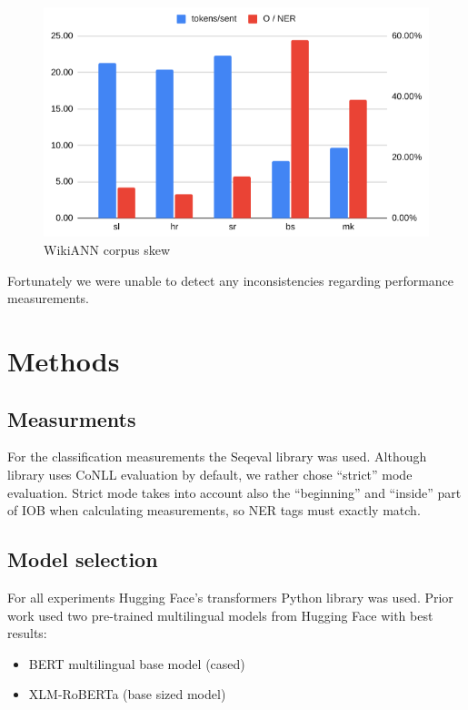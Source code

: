 \documentclass[sigconf]{acmart}
\begin{document}
\begin{figure}[h]
  \label{fig:corpora_analysis1}
  \centering
  \includegraphics[width=\linewidth]{wikiann-skew}
  \caption{WikiANN corpus skew}
\end{figure}

Fortunately we were unable to detect any inconsistencies regarding performance measurements.

\section{Methods}
\subsection{Measurments}
For the classification measurements the Seqeval library\cite{seqeval} was used.
Although library uses CoNLL evaluation by default, we rather chose ``strict'' mode evaluation.
Strict mode takes into account also the ``beginning'' and ``inside'' part of IOB when calculating measurements,
so NER tags must exactly match.

\subsection{Model selection}
For all experiments Hugging Face's transformers Python library\cite{wolf-etal-2020-transformers} was used.
Prior work used two pre-trained multilingual models from Hugging Face with best results:
\begin{itemize}
  \item BERT multilingual base model (cased)\cite{DBLP:journals/corr/abs-1810-04805}
  \item XLM-RoBERTa (base sized model)\cite{DBLP:journals/corr/abs-1911-02116}
\end{itemize}
\end{document}
